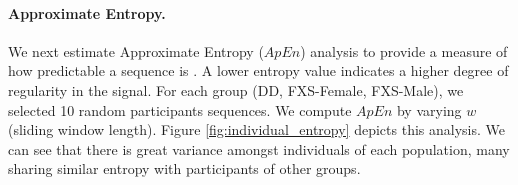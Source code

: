 \documentclass{llncs}
\begin{document}

  \paragraph{Approximate Entropy.} We next estimate Approximate Entropy ($ApEn$) analysis to provide a measure of how predictable a sequence is \cite{Restrepo:2014gs,entrophy} . A lower entropy value indicates a higher degree of regularity in the signal. For each group (DD, FXS-Female, FXS-Male), we selected 10 random participants sequences. We compute $ApEn$ by varying $w$ (sliding window length). Figure \ref{fig:individual_entropy} depicts this analysis. We can see that there is great variance amongst individuals of each population, many sharing similar entropy with participants of other groups.
\end{document}
